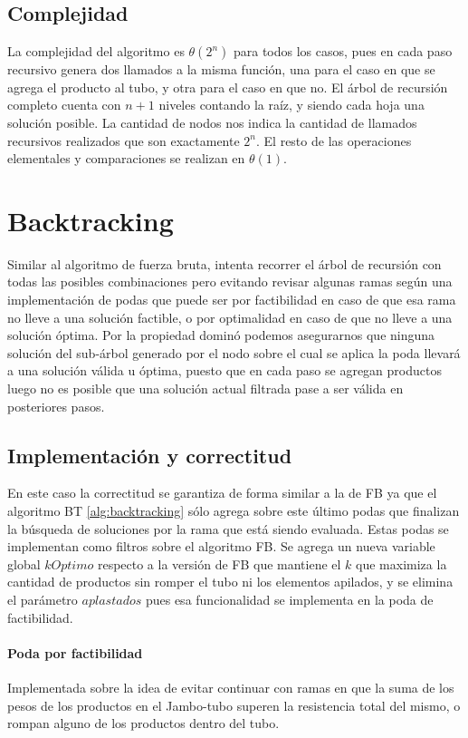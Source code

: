\documentclass[10pt,a4paper]{article}
\begin{document}
\subsection{Complejidad}
La complejidad del algoritmo es $\theta(2^n)$ para todos los casos, pues en cada paso recursivo genera dos llamados a la misma función, una para el caso en que se agrega el producto al tubo, y otra para el caso en que no. El árbol de recursión completo cuenta con $n+1$ niveles contando la raíz, y siendo cada hoja una solución posible. La cantidad de nodos nos indica la cantidad de llamados recursivos realizados que son exactamente $2^n$.
El resto de las operaciones elementales y comparaciones se realizan en $\theta(1)$.

\section{Backtracking} \label{sec:backtracking}
Similar al algoritmo de fuerza bruta, intenta recorrer el árbol de recursión con todas las posibles combinaciones pero evitando revisar algunas ramas según una implementación de podas que puede ser por factibilidad en caso de que esa rama no lleve a una solución factible, o por optimalidad en caso de que no lleve a una solución óptima. Por la propiedad dominó podemos asegurarnos que ninguna solución del sub-árbol generado por el nodo sobre el cual se aplica la poda llevará a una solución válida u óptima, puesto que en cada paso se agregan productos luego no es posible que una solución actual filtrada pase a ser válida en posteriores pasos.

\subsection{Implementación y correctitud}
En este caso la correctitud se garantiza de forma similar a la de FB ya que el algoritmo BT \ref{alg:backtracking} sólo agrega sobre este último podas que finalizan la búsqueda de soluciones por la rama que está siendo evaluada. Estas podas se implementan como filtros sobre el algoritmo FB. Se agrega un nueva variable global $kOptimo$ respecto a la versión de FB que mantiene el $k$ que maximiza la cantidad de productos sin romper el tubo ni los elementos apilados, y se elimina el parámetro $aplastados$ pues esa funcionalidad se implementa en la poda de factibilidad. 

\paragraph{Poda por factibilidad}
Implementada sobre la idea de evitar continuar con ramas en que la suma de los pesos de los productos en el Jambo-tubo superen la resistencia total del mismo, o rompan alguno de los productos dentro del tubo.
\end{document}
